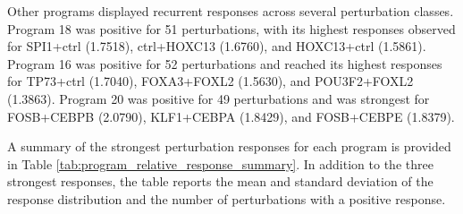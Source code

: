 \documentclass[11pt,a4paper]{article}
\begin{document}
Other programs displayed recurrent responses across several perturbation classes. Program 18 was positive for 51 perturbations, with its highest responses observed for SPI1+ctrl (1.7518), ctrl+HOXC13 (1.6760), and HOXC13+ctrl (1.5861). Program 16 was positive for 52 perturbations and reached its highest responses for TP73+ctrl (1.7040), FOXA3+FOXL2 (1.5630), and POU3F2+FOXL2 (1.3863). Program 20 was positive for 49 perturbations and was strongest for FOSB+CEBPB (2.0790), KLF1+CEBPA (1.8429), and FOSB+CEBPE (1.8379).

A summary of the strongest perturbation responses for each program is provided in Table \ref{tab:program_relative_response_summary}. In addition to the three strongest responses, the table reports the mean and standard deviation of the response distribution and the number of perturbations with a positive response.
\end{document}
